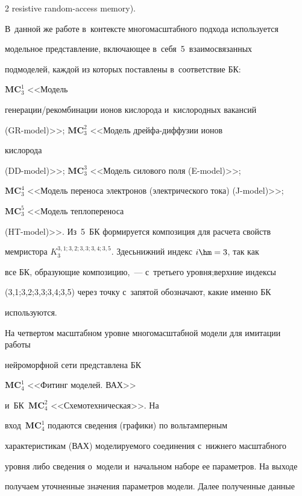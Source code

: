 \begin{multicols}{2}
resistive random-access memory). 


В~данной же работе в~контексте многомасштабного подхода используется 


модельное пред\-став\-ле\-ние, вклю\-ча\-ющее в~себя~5~взаимосвязанных 


подмоделей, каждой из которых по\-став\-ле\-ны в~соответствие БК: 


$\mathbf{MC}_3^1$ <<Модель  


ге\-не\-ра\-ции/ре\-ком\-би\-на\-ции ионов кислорода и~кис\-ло\-род\-ных вакансий  


(GR-model)>>; $\mathbf{MC}_3^2$ <<Модель дрей\-фа-диф\-фу\-зии ионов 


кислорода  


(DD-model)>>; $\mathbf{MC}_3^3$ <<Модель силового поля (E-model)>>; 


$\mathbf{MC}_3^4$ <<Модель переноса электронов (электрического тока) (J-model)>>;


$\mathbf{MC}_3^5$ <<Модель теплопереноса  


(HT-model)>>. Из~5~БК формируется композиция для расчета свойств 


мемристора $K_3^{3,1; 3,2; 3,3; 3,4; 3,5}$. Здесь\linebreak нижний индекс $i\hm=3$, так как 


все БК, об\-ра\-зующие композицию,~--- с~треть\-его уровня;\linebreak верхние индексы 


(3,1;3,2;3,3;3,4;3,5) через точку с~запятой обозначают, какие именно БК 


ис\-поль\-зу\-ются.


 


     


     На четвертом масштабном уровне многомасштабной модели для имитации работы 


нейроморфной сети представлена БК


$\mathbf{MC}_4^1$ <<Фитинг моделей. ВАХ>> 


и~БК~$\mathbf{MC}_4^2$ <<Схемотехническая>>. На 


вход~$\mathbf{MC}_4^1$ подаются сведения (графики) по вольтамперным 


характеристикам (ВАХ) моделируемого соединения с~нижнего масштабного 


уровня либо сведения о~модели и~начальном наборе ее па\-ра\-мет\-ров. На выходе 


получаем уточненные значения па\-ра\-мет\-ров модели. Далее полученные данные 



\end{multicols}
